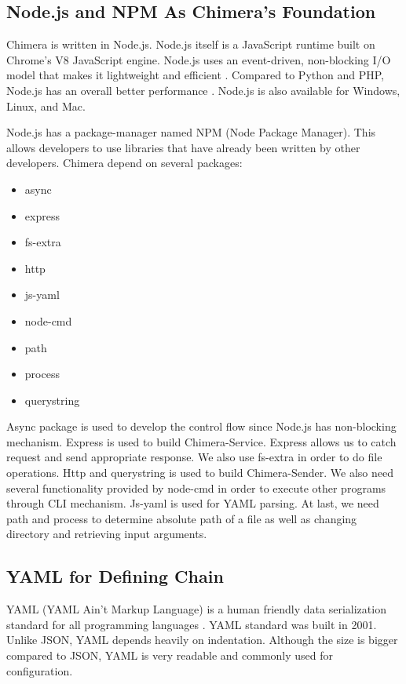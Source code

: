 \documentclass[conference]{IEEEtran}
\begin{document}
\subsection{Node.js and NPM As Chimera's Foundation}

Chimera is written in Node.js. Node.js itself is a JavaScript runtime built on Chrome's 
V8 JavaScript engine. Node.js uses an event-driven, non-blocking I/O model that makes it 
lightweight and efficient \cite{nodejs}. Compared to Python and PHP, Node.js has an 
overall better performance \cite{lei2014performance}. Node.js is also available for
Windows, Linux, and Mac.

Node.js has a package-manager named NPM (Node Package Manager). This allows developers
to use libraries that have already been written by other developers. Chimera depend on 
several packages:

\begin{itemize}
    \item async
    \item express
    \item fs-extra
    \item http
    \item js-yaml
    \item node-cmd
    \item path
    \item process
    \item querystring
\end{itemize}

Async package is used to develop the control flow since Node.js has non-blocking
mechanism. Express is used to build Chimera-Service. Express allows us to catch request
and send appropriate response. We also use fs-extra in order to do file operations.
Http and querystring is used to build Chimera-Sender. We also need several functionality
provided by node-cmd in order to execute other programs through CLI mechanism.
Js-yaml is used for YAML parsing. At last, we need path and process to determine 
absolute path of a file as well as changing directory and retrieving input arguments.

\subsection{YAML for Defining Chain}

YAML (YAML Ain't Markup Language) is a human friendly data serialization standard for 
all programming languages \cite{yaml}. YAML standard was built in 2001. Unlike JSON,
YAML depends heavily on indentation. Although the size is bigger compared to JSON, YAML
is very readable and commonly used for configuration.
\end{document}
